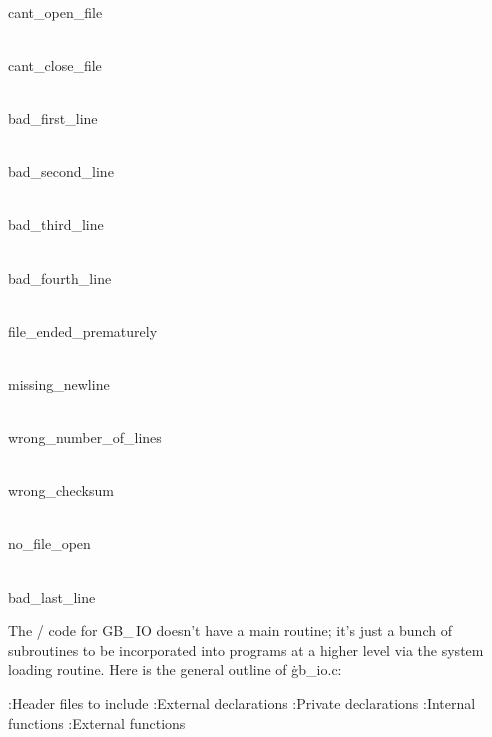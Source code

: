 \Y\B\4\D\\{cant\_open\_file}\5
\par
\B\4\D\\{cant\_close\_file}\5
\par
\B\4\D\\{bad\_first\_line}\5
\par
\B\4\D\\{bad\_second\_line}\5
\par
\B\4\D\\{bad\_third\_line}\5
\par
\B\4\D\\{bad\_fourth\_line}\5
\par
\B\4\D\\{file\_ended\_prematurely}\5
\par
\B\4\D\\{missing\_newline}\5
\par
\B\4\D\\{wrong\_number\_of\_lines}\5
\par
\B\4\D\\{wrong\_checksum}\5
\par
\B\4\D\\{no\_file\_open}\5
\par
\B\4\D\\{bad\_last\_line}\5
\par
\fi

The \CEE/ code for {\sc GB\_\,IO} doesn't have a main routine; it's just a
bunch of subroutines to be incorporated into programs at a higher level
via the system loading routine. Here is the general outline of \.{gb\_io.c}:

\Y\B{}:Header files to include\X\6
\ATH\6
:External declarations\X\6
:Private declarations\X\6
:Internal functions\X\6
:External functions\X\par
\fi

